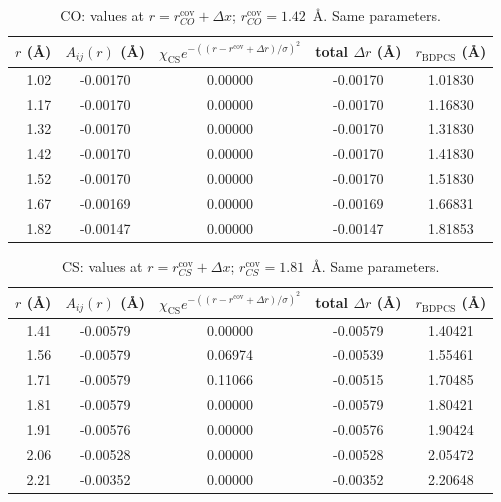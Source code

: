 \documentclass[a4paper]{article}
\begin{document}
\begin{table}[h]
\centering
\caption{CO: values at $r=r^{\mathrm{cov}}_{CO}+\Delta x$; $r^{\mathrm{cov}}_{CO}=1.42$~\AA. Same parameters.}
\begin{tabular}{rcccc}
\hline
$r$ (\AA) & $A_{ij}(r)$ (\AA) & $\chi_{\mathrm{CS}}e^{-((r-r^{\mathrm{cov}}+\Delta r)/\sigma)^2}$ & total $\Delta r$ (\AA) & $r_{\mathrm{BDPCS}}$ (\AA) \\
\hline
1.02 & -0.00170 & 0.00000 & -0.00170 & 1.01830 \\
1.17 & -0.00170 & 0.00000 & -0.00170 & 1.16830 \\
1.32 & -0.00170 & 0.00000 & -0.00170 & 1.31830 \\
1.42 & -0.00170 & 0.00000 & -0.00170 & 1.41830 \\
1.52 & -0.00170 & 0.00000 & -0.00170 & 1.51830 \\
1.67 & -0.00169 & 0.00000 & -0.00169 & 1.66831 \\
1.82 & -0.00147 & 0.00000 & -0.00147 & 1.81853 \\
\hline
\end{tabular}
\end{table}

\begin{table}[h]
\centering
\caption{CS: values at $r=r^{\mathrm{cov}}_{CS}+\Delta x$; $r^{\mathrm{cov}}_{CS}=1.81$~\AA. Same parameters.}
\begin{tabular}{rcccc}
\hline
$r$ (\AA) & $A_{ij}(r)$ (\AA) & $\chi_{\mathrm{CS}}e^{-((r-r^{\mathrm{cov}}+\Delta r)/\sigma)^2}$ & total $\Delta r$ (\AA) & $r_{\mathrm{BDPCS}}$ (\AA) \\
\hline
1.41 & -0.00579 & 0.00000 & -0.00579 & 1.40421 \\
1.56 & -0.00579 & 0.06974 & -0.00539 & 1.55461 \\
1.71 & -0.00579 & 0.11066 & -0.00515 & 1.70485 \\
1.81 & -0.00579 & 0.00000 & -0.00579 & 1.80421 \\
1.91 & -0.00576 & 0.00000 & -0.00576 & 1.90424 \\
2.06 & -0.00528 & 0.00000 & -0.00528 & 2.05472 \\
2.21 & -0.00352 & 0.00000 & -0.00352 & 2.20648 \\
\hline
\end{tabular}
\end{table}
\end{document}
